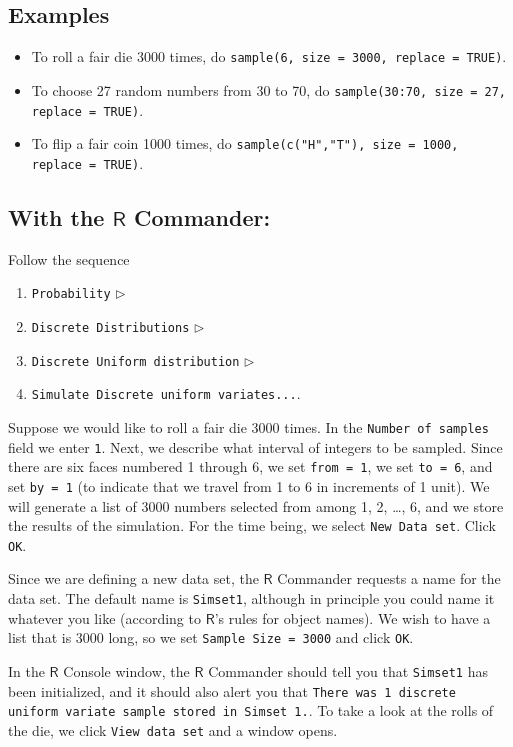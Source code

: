 \subsection{Examples}
\label{sec-5-2-3}
\begin{itemize}
\item To roll a fair die 3000 times, do \texttt{sample(6, size = 3000, replace = TRUE)}.
\item To choose 27 random numbers from 30 to 70, do \texttt{sample(30:70, size = 27, replace = TRUE)}.
\item To flip a fair coin 1000 times, do \texttt{sample(c("H","T"), size = 1000, replace = TRUE)}.
\end{itemize}

\subsection{With the \(\mathsf{R}\) Commander:}
\label{sec-5-2-4}

Follow the sequence 
\begin{enumerate}
\item \texttt{Probability} \(\triangleright\)
\item \texttt{Discrete Distributions} \(\triangleright\)
\item \texttt{Discrete Uniform distribution} \(\triangleright\)
\item \texttt{Simulate Discrete uniform variates...}.
\end{enumerate}

Suppose we would like to roll a fair die 3000 times. In the \texttt{Number of
samples} field we enter \texttt{1}. Next, we describe what interval of
integers to be sampled. Since there are six faces numbered 1 through
6, we set \texttt{from = 1}, we set \texttt{to = 6}, and set \texttt{by = 1} (to indicate
that we travel from 1 to 6 in increments of 1 unit). We will generate
a list of 3000 numbers selected from among 1, 2, \ldots{}, 6, and we store
the results of the simulation. For the time being, we select \texttt{New Data
set}. Click \texttt{OK}.

Since we are defining a new data set, the \(\mathsf{R}\) Commander
requests a name for the data set. The default name is \texttt{Simset1},
although in principle you could name it whatever you like (according
to \(\mathsf{R}\)'s rules for object names). We wish to have a list
that is 3000 long, so we set \texttt{Sample Size = 3000} and click \texttt{OK}.

In the \(\mathsf{R}\) Console window, the \(\mathsf{R}\) Commander
should tell you that \texttt{Simset1} has been initialized, and it should
also alert you that \texttt{There was 1 discrete uniform variate sample
stored in Simset 1.}. To take a look at the rolls of the die, we click
\texttt{View data set} and a window opens.

